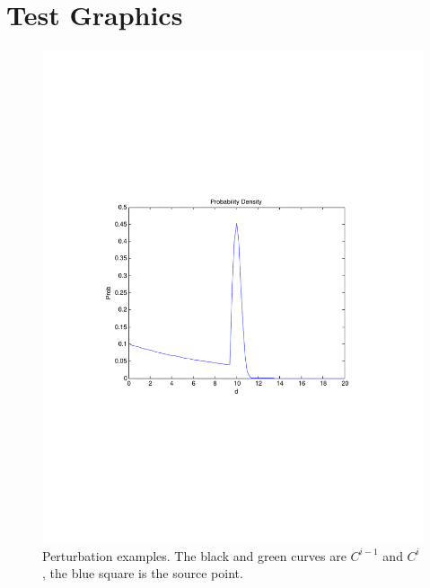 \documentclass[10pt]{article}
\begin{document}
\section{Test Graphics}

\begin{figure}[h]
	\centering
	\includegraphics[width=0.4\linewidth]{ProbFunction}
	\caption{Perturbation examples. The black and green curves are $C^{i-1}$ and $C^{i}$, the blue square is the source point.}
\end{figure}
\end{document}
